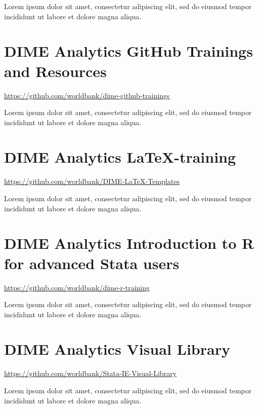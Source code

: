 \noindent Lorem ipsum dolor sit amet, consectetur adipiscing elit, sed do eiusmod tempor incididunt ut labore et dolore magna aliqua.


\filbreak
\section{DIME Analytics GitHub Trainings and Resources}
\url{https://github.com/worldbank/dime-github-trainings}
\vspace{\baselineskip}

\noindent Lorem ipsum dolor sit amet, consectetur adipiscing elit, sed do eiusmod tempor incididunt ut labore et dolore magna aliqua.


\filbreak
\section{DIME Analytics \LaTeX-training}
\url{https://github.com/worldbank/DIME-LaTeX-Templates}
\vspace{\baselineskip}

\noindent Lorem ipsum dolor sit amet, consectetur adipiscing elit, sed do eiusmod tempor incididunt ut labore et dolore magna aliqua.


\filbreak
\section{DIME Analytics Introduction to R for advanced Stata users}
\url{https://github.com/worldbank/dime-r-training}
\vspace{\baselineskip}

\noindent Lorem ipsum dolor sit amet, consectetur adipiscing elit, sed do eiusmod tempor incididunt ut labore et dolore magna aliqua.


\filbreak
\section{DIME Analytics Visual Library}
\url{https://github.com/worldbank/Stata-IE-Visual-Library}
\vspace{\baselineskip}

\noindent Lorem ipsum dolor sit amet, consectetur adipiscing elit, sed do eiusmod tempor incididunt ut labore et dolore magna aliqua.



\mainmatter
